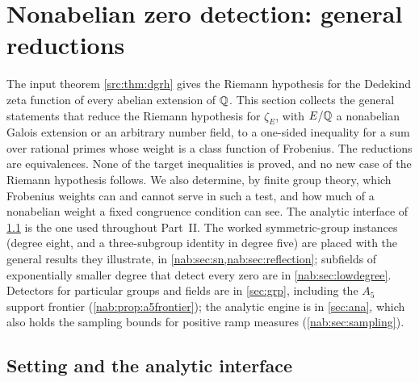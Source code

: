 \providecommand{\grpIrr}{\operatorname{Irr}}
\providecommand{\grpSt}{\mathrm{St}}
\providecommand{\grpFix}{\operatorname{Fix}}
\providecommand{\grpsgn}{\operatorname{sgn}}
\providecommand{\grpstd}{\mathrm{std}}
\providecommand{\grpone}{\mathbf{1}}
\providecommand{\grpDiff}{\mathfrak{D}}
\providecommand{\grprd}{\operatorname{rd}}
\providecommand{\grppos}[1]{#1^{+}}
\section{Nonabelian zero detection: general reductions}\label{sec:nab}
\providecommand{\nabFix}{\operatorname{Fix}}
\providecommand{\nabIrr}{\operatorname{Irr}}
\providecommand{\nabsgn}{\operatorname{sgn}}
\providecommand{\nabone}{\mathbf{1}}
\providecommand{\nabpos}[1]{(#1)^{+}}

The input theorem \cref{src:thm:dgrh} gives the Riemann hypothesis for the Dedekind zeta
function of every abelian extension of $\mathbb{Q}$. This section collects the general statements
that reduce the Riemann hypothesis for $\zeta_E$, with $E/\mathbb{Q}$ a nonabelian Galois extension
or an arbitrary number field, to a one-sided inequality for a sum over rational primes whose
weight is a class function of Frobenius. The reductions are equivalences. None of the
target inequalities is proved, and no new case of the Riemann hypothesis follows. We also determine, by finite group theory, which Frobenius
weights can and cannot serve in such a test, and how much of a nonabelian weight a fixed
congruence condition can see. The analytic interface of \cref{nab:sec:interface} is the
one used throughout Part~II. The worked symmetric-group instances (degree eight, and a
three-subgroup identity in degree five) are placed with the general results they
illustrate, in \cref{nab:sec:sn,nab:sec:reflection}; subfields of exponentially smaller
degree that detect every zero are in \cref{nab:sec:lowdegree}. Detectors for particular groups and
fields are in \cref{sec:grp}, including the $A_5$ support frontier
(\cref{nab:prop:a5frontier}); the analytic engine is in \cref{sec:ana}, which also holds
the sampling bounds for positive ramp measures (\cref{nab:sec:sampling}).

\subsection{Setting and the analytic interface}\label{nab:sec:interface}
\begingroup\raggedright
{}
\endgroup

